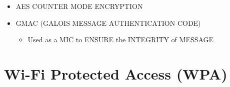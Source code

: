 \begin{itemize}
\begin{itemize}
    \begin{itemize}
    \tightlist
    \item
      AES COUNTER MODE ENCRYPTION
    \item
      GMAC (GALOIS MESSAGE AUTHENTICATION CODE)

      \begin{itemize}
      \tightlist
      \item
        Used as a MIC to ENSURE the INTEGRITY of MESSAGE
      \end{itemize}
    \end{itemize}
  \end{itemize}
\end{itemize}

\section{Wi-Fi Protected Access (WPA)}\label{wi-fi-protected-access-wpa}

